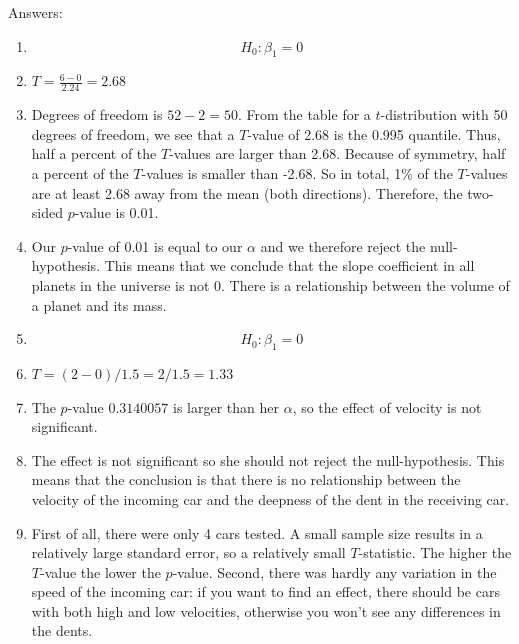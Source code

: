 \documentclass[]{report}\usepackage[]{graphicx}\usepackage[]{color}
\begin{document}
Answers:

\begin{enumerate}

\item

\begin{equation}
H_0: \beta_1 = 0
\end{equation}



\item $T= \frac{6 - 0}{2.24}= 2.68 $

\item

Degrees of freedom is $52-2=50$. From the table for a $t$-distribution with 50 degrees of freedom, we see that a $T$-value of 2.68 is the 0.995 quantile. Thus, half a percent of the $T$-values are larger than 2.68. Because of symmetry, half a percent of the $T$-values is smaller than -2.68. So in total, 1\% of the $T$-values are at least 2.68 away from the mean (both directions). Therefore, the two-sided $p$-value is 0.01.

\item Our $p$-value of 0.01 is equal to our $\alpha$ and we therefore reject the null-hypothesis. This means that we conclude that the slope coefficient in all planets in the universe is not 0. There is a relationship between the volume of a planet and its mass.

\item

\begin{equation}
H_0: \beta_1= 0
\end{equation}

\item
$T= (2-0)/1.5=2/1.5=1.33$

\item
The $p$-value $0.3140057$ is larger than her $\alpha$, so the effect of velocity is not significant.

\item
 The effect is not significant so she should not reject the null-hypothesis. This means that the conclusion is that there is no relationship between the velocity of the incoming car and the deepness of the dent in the receiving car.

\item First of all, there were only 4 cars tested. A small sample size results in a relatively large standard error, so a relatively small $T$-statistic. The higher the $T$-value the lower the $p$-value. Second, there was hardly any variation in the speed of the incoming car: if you want to find an effect, there should be cars with both high and low velocities, otherwise you won't see any differences in the dents.

\end{enumerate}
\end{document}
